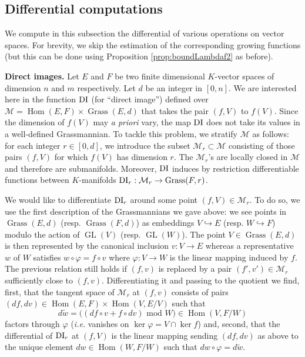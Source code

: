 \documentclass{sig-alternate}
\DeclareMathOperator{\Hom}{Hom}
\DeclareMathOperator{\GL}{GL}
\DeclareMathOperator{\Grass}{Grass}
\newcommand{\DI}{\text{\rm DI}}
\begin{document}
\subsection{Differential computations}

We compute in this subsection the differential of various operations on 
vector spaces. For brevity, we skip the estimation of the corresponding 
growing functions (but this can be done using Proposition 
\ref{prop:boundLambdaf2} as before).

\smallskip

\noindent
{\bf Direct images.}
Let $E$ and $F$ be two finite dimensional $K$-vector spaces of dimension 
$n$ and $m$ respectively. Let $d$ be an integer in $[0,n]$. We are
interested here in the function $\DI$ (for ``direct image'') defined 
over $\mathcal M = \Hom(E,F) \times \Grass(E,d)$ that takes the 
pair $(f,V)$ to $f(V)$. Since the dimension of $f(V)$ may \emph{a 
priori} vary, the map $\DI$ does not take its values in a well-defined 
Grassmannian. To tackle this problem, we stratify $\mathcal M$ as
follows: for each integer $r \in [0,d]$, we introduce the subset
$\mathcal M_r \subset \mathcal M$ consisting of those pairs $(f,V)$
for which $f(V)$ has dimension $r$. The $\mathcal M_r$'s are
locally closed in $\mathcal M$ and therefore are submanifolds. 
Moreover, $\DI$ induces by restriction differentiable 
functions between $K$-manifolds
$\DI_r : \mathcal M_r \to \Grass(F,r)$.

We would like to differentiate $\DI_r$ around some point $(f,V) \in 
\mathcal M_r$. To do so, we use the first description of the 
Grassmannians we gave above: we see points in $\Grass(E,d)$ 
(resp. $\Grass(F,d)$) as embeddings $V \hookrightarrow E$ (resp. $W 
\hookrightarrow F$) modulo the action of $\GL(V)$ (resp. $\GL(W)$).
The point $V \in \Grass(E,d)$ is then represented by the canonical 
inclusion $v : V \to E$ whereas a representative $w$ of $W$ satisfies
$w \circ \varphi = f \circ v$
where $\varphi : V \to W$ is the linear mapping induced by $f$. The 
previous relation still holds if $(f,v)$ is replaced by a pair $(f', 
v') \in \mathcal M_r$ sufficiently close to $(f,v)$.
Differentiating it and passing to the quotient we find, first, that the 
tangent space of $\mathcal M_r$ at $(f,v)$ consists of pairs $(df, dv) 
\in \Hom(E,F) \times \Hom(V,E/V)$ such that
$$d\tilde w = \big((df \circ v + f \circ dv) \text{ mod } W\big)
\in \Hom(V, F/W)$$
factors through $\varphi$ (\emph{i.e.} vanishes on $\ker \varphi = V 
\cap \ker f$) and, second, that the differential of $\DI_r$ at $(f,V)$ 
is the linear mapping sending $(df,dv)$ as above to the unique element 
$dw \in \Hom(W,F/W)$ such that $dw \circ \varphi = d \tilde w$.
\end{document}
